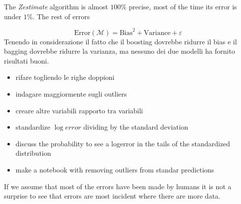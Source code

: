 The \textit{Zestimate} algorithm is almost $100\%$ precise, most of the time its error is under $1\%$. The rest of errors  

$$\text{Error}(\mathcal{M} ) = \text{Bias}^2 + \text{Variance} + \varepsilon$$
Tenendo in considerazione il fatto che il boosting dovrebbe ridurre il bias e il bagging dovrebbe ridurre la varianza, ma nessuno dei due modelli ha fornito risultati buoni.

\begin{itemize}
  \item rifare togliendo le righe doppioni
  \item indagare maggiormente sugli outliers
  \item creare altre variabili rapporto tra variabili
  \item standardize $\log error$ dividing by the standard deviation
  \item discuss the probability to see a logerror in the tails of the standardized distribution
  \item make a notebook with removing outliers from standar predictions
\end{itemize}

If we assume that most of the errors have been made by humans it is not a surprise to see that errors are most incident where there are more data.